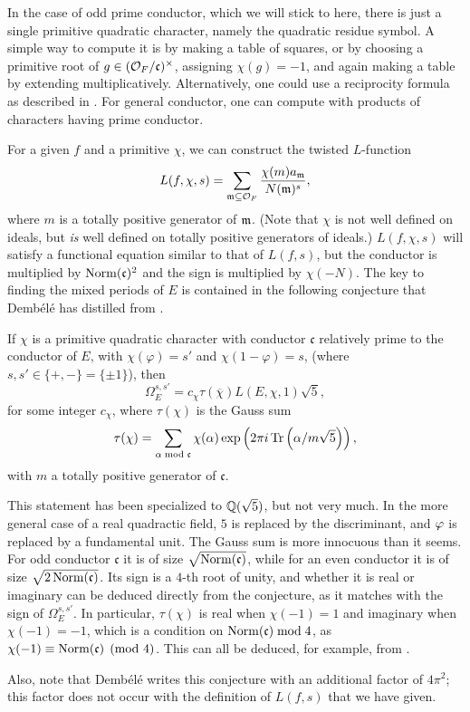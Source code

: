 \documentclass{amsart}
\newcommand{\fc}{\mathfrak{c}}
\newcommand{\OF}{\cO_F}
\newcommand{\dembele}{Demb\'el{\'e}\xspace}
\begin{document}
In the case of odd prime conductor, which we will stick to here, there is
just a single primitive quadratic character, namely the quadratic residue symbol.
A simple way to compute it is by making a
table of squares, or by choosing a primitive root of $g \in (\OF/\fc)^\times$, assigning
$\chi(g) = -1$, and again making a table by extending multiplicatively. Alternatively,
one could use a reciprocity formula as described in \cite{boylan-skoruppa:hecke-gauss-sums}.
For general conductor, one can compute with products of characters having prime conductor.

For a given $f$ and a primitive $\chi$, we can construct the twisted $L$-function
\[
    L(f, \chi, s) = \sum_{\m \subseteq \OF} \frac{\chi(m)a{_{\m}}}{N(\m)^s},
\]
where $m$ is a totally positive generator of $\mathfrak{m}$. (Note that $\chi$ is not well defined
on ideals, but {\em is} well defined on totally positive generators of ideals.) $L(f, \chi, s)$
will satisfy a functional equation similar to that of $L(f, s)$, but the conductor is
multiplied by $\Norm(\fc)^2$ and the sign is multiplied by $\chi(-N)$. The key to finding the
mixed periods of $E$ is contained in the following conjecture that \dembele has distilled
from \cite{bertolini-darmon-green}.
\begin{conjecture}
If $\chi$ is a primitive quadratic character with conductor $\fc$ relatively prime to the
conductor of $E$, with $\chi(\varphi) = s'$ and
$\chi(1 - \varphi) = s$, (where $s, s' \in \{+, -\} = \{\pm1\}$), then
\[
    \Omega^{s,s'}_E = c_\chi \tau(\overline\chi) L(E, \chi, 1)\sqrt5,
\]
for some integer $c_\chi$, where $\tau(\chi)$ is the Gauss sum
\[
    \tau(\chi) = \sum_{\alpha \bmod \fc} \chi(\alpha) \exp\left(2 \pi i \Tr\left(\alpha/m\sqrt{5}\right) \right),
\]
with $m$ a totally positive generator of $\fc$.
\end{conjecture}
\begin{remark}
  This statement has been specialized to $\mathbb{Q}(\sqrt 5)$, but not very
  much. In the more general case of a real quadractic field, $5$ is
  replaced by the discriminant, and $\varphi$ is replaced by a
  fundamental unit.  The Gauss sum is more innocuous than it
  seems. For odd conductor $\fc$ it is of size $\sqrt{\Norm(\fc)}$, while
  for an even conductor it is of size $\sqrt{2 \Norm(\fc) }$.  Its sign is
  a $4$-th root of unity, and whether it is real or imaginary can be
  deduced directly from the conjecture, as it matches with the sign of
  $\Omega^{s,s'}_E$. In particular, $\tau(\chi)$ is real when
  $\chi(-1) = 1$ and imaginary when $\chi(-1) = -1$, which is a
  condition on $\Norm(\fc) \bmod 4$, as $\chi(-1) \equiv \Norm(\fc) \pmod
  4$. This can all be deduced, for example, from
  \cite{boylan-skoruppa:hecke-gauss-sums}.

Also, note that \dembele writes this conjecture with an additional factor of $4\pi^2$;
this factor does not occur with the definition of $L(f, s)$ that we have given.

\end{remark}
\end{document}

